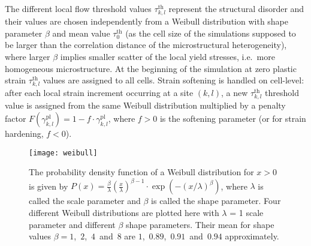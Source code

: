 The different local flow threshold values $\tau _{k,l}^{{\text{th}}}$ represent the structural disorder and their values are chosen independently from a Weibull distribution with shape parameter $\beta$ and mean value $\tau _0^{{\text{th}}}$ (as the cell size of the simulations supposed to be larger than the correlation distance of the microstructural heterogeneity), where larger $\beta$ implies smaller scatter of the local yield stresses, i.e.\ more homogeneous microstructure. At the beginning of the simulation at zero plastic strain $\tau _{k,l}^{{\text{th}}}$ values are assigned to all cells. Strain softening is handled on cell-level: after each local strain increment occurring at a site $\left( {k,l} \right)$, a new $\tau _{k,l}^{{\text{th}}}$ threshold value is assigned from the same Weibull distribution multiplied by a penalty factor $F\left( {\gamma _{k,l}^{{\text{pl}}}} \right) = 1 - f \cdot \gamma _{k,l}^{{\text{pl}}}$, where $f > 0$ is the softening parameter (or for strain hardening, $f < 0$).

\begin{figure}[htbp!] 
\centering    
\texttt{[image: weibull]}
\caption[Weibull distributions]{The probability density function of a Weibull distribution for $x>0$ is given by $P\left( x \right) = \frac{\beta }{\lambda }{\left( {\frac{x}{\lambda }} \right)^{\beta  - 1}} \cdot \exp \left( { - {{\left( {x/\lambda } \right)}^\beta }} \right)$, where $\lambda$ is called the scale parameter and $\beta$ is called the shape parameter. Four different Weibull distributions are plotted here with $\lambda$ = 1 scale parameter and different $\beta$ shape parameters. Their mean for shape values $\beta=1$,~$2$,~$4$~and~$8$ are $1$,~$0.89$,~$0.91$~and~$0.94$ approximately.}
\label{fig:weibull_look_like}
\end{figure}


